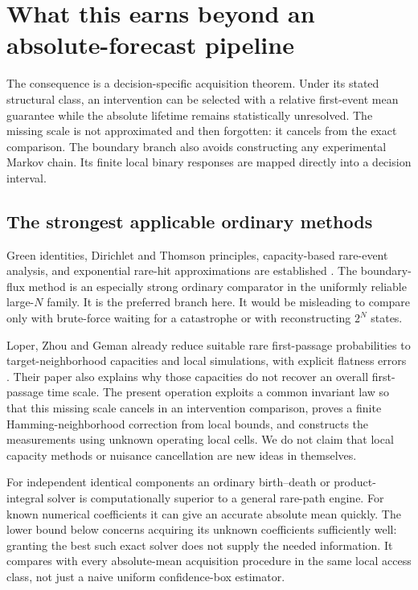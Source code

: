\section{What this earns beyond an absolute-forecast pipeline}
The consequence is a decision-specific acquisition theorem. Under its stated structural class, an intervention can be selected with a relative first-event mean guarantee while the absolute lifetime remains statistically unresolved. The missing scale is not approximated and then forgotten: it cancels from the exact comparison. The boundary branch also avoids constructing any experimental Markov chain. Its finite local binary responses are mapped directly into a decision interval.

\subsection{The strongest applicable ordinary methods}
Green identities, Dirichlet and Thomson principles, capacity-based rare-event analysis, and exponential rare-hit approximations are established \cite{aldousfill,bovier,aldousbrown}. The boundary-flux method is an especially strong ordinary comparator in the uniformly reliable large-$N$ family. It is the preferred branch here. It would be misleading to compare only with brute-force waiting for a catastrophe or with reconstructing $2^N$ states.

Loper, Zhou and Geman already reduce suitable rare first-passage probabilities to target-neighborhood capacities and local simulations, with explicit flatness errors \cite{loper}. Their paper also explains why those capacities do not recover an overall first-passage time scale. The present operation exploits a common invariant law so that this missing scale cancels in an intervention comparison, proves a finite Hamming-neighborhood correction from local bounds, and constructs the measurements using unknown operating local cells. We do not claim that local capacity methods or nuisance cancellation are new ideas in themselves.

For independent identical components an ordinary birth--death or product-integral solver is computationally superior to a general rare-path engine. For known numerical coefficients it can give an accurate absolute mean quickly. The lower bound below concerns acquiring its unknown coefficients sufficiently well: granting the best such exact solver does not supply the needed information. It compares with every absolute-mean acquisition procedure in the same local access class, not just a naive uniform confidence-box estimator.

